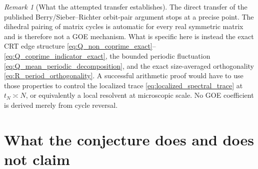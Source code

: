 \documentclass[11pt]{amsart}
\numberwithin{equation}{section}
\theoremstyle{plain}
\theoremstyle{definition}
\theoremstyle{remark}
\newtheorem{remark}[theorem]{Remark}
\begin{document}
\begin{remark}[What the attempted transfer establishes]
\label{rem:cycle_mechanism_status}
The direct transfer of the published Berry/Sieber--Richter orbit-pair argument stops at a precise point.  The dihedral pairing of matrix cycles is automatic for every real symmetric matrix and is therefore not a GOE mechanism.  What is specific here is instead the exact CRT edge structure \eqref{eq:Q_non_coprime_exact}--\eqref{eq:Q_coprime_indicator_exact}, the bounded periodic fluctuation \eqref{eq:Q_mean_periodic_decomposition}, and the exact size-averaged orthogonality \eqref{eq:R_period_orthogonality}.  A successful arithmetic proof would have to use those properties to control the localized trace \eqref{eq:localized_spectral_trace} at $t_N\asymp N$, or equivalently a local resolvent at microscopic scale.  No GOE coefficient is derived merely from cycle reversal.
\end{remark}

\section{What the conjecture does and does not claim}
\label{sec:scope}
\end{document}

